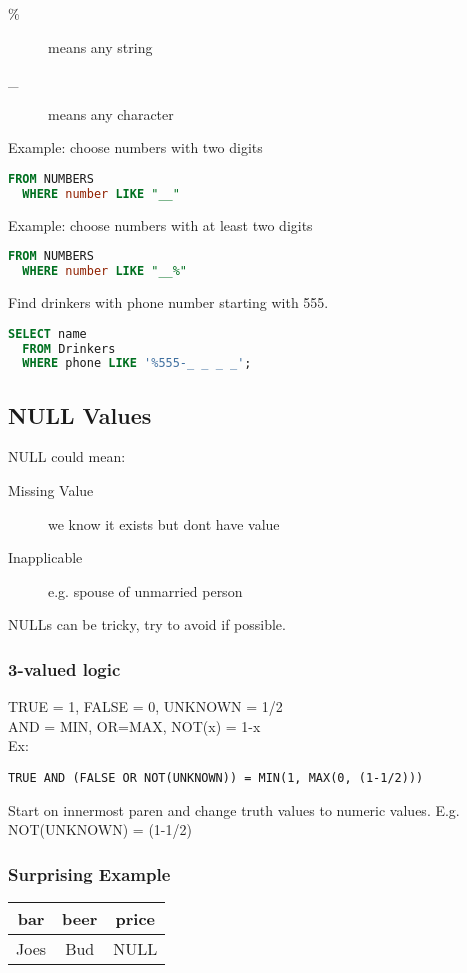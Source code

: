 \documentclass[12pt]{article}
\begin{document}
\begin{description}
    \item[\%] {means any string}
    \item[\_] {means any character}
\end{description}

Example: choose numbers with two digits
\begin{lstlisting}[language=SQL]
  FROM NUMBERS
  WHERE number LIKE "__"
\end{lstlisting}
Example: choose numbers with at least two digits
\begin{lstlisting}[language=SQL]
  FROM NUMBERS
  WHERE number LIKE "__%"
\end{lstlisting}
Find drinkers with phone number starting with 555.
\begin{lstlisting}[language=SQL]
  SELECT name
  FROM Drinkers
  WHERE phone LIKE '%555-_ _ _ _';
\end{lstlisting}

\subsection{NULL Values}
NULL could mean:
\begin{description}
    \item[Missing Value]{we know it exists but dont have value}
    \item[Inapplicable]{e.g. spouse of unmarried person}
\end{description}

NULLs can be tricky, try to avoid if possible.\\
\subsubsection{3-valued logic}
TRUE = 1, FALSE = 0, UNKNOWN = 1/2\\
AND = MIN, OR=MAX, NOT(x) = 1-x\\
Ex:
\begin{verbatim}
TRUE AND (FALSE OR NOT(UNKNOWN)) = MIN(1, MAX(0, (1-1/2)))
\end{verbatim}
Start on innermost paren and change truth values to numeric values.
E.g. NOT(UNKNOWN) = (1-1/2)

\subsubsection{Surprising Example}
\begin{table}[H]
  \begin{tabular}{|c|c|c|}
    \hline
    bar & beer & price\\
    \hline
    Joes & Bud & NULL\\
    \hline
\end{tabular}
\end{table}
\end{document}
